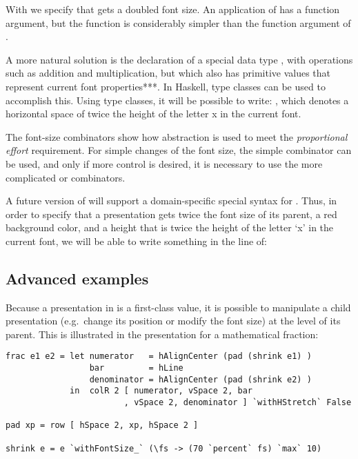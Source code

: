 With  we specify that  gets a doubled font size. An application of  has a function argument, but the function is considerably simpler than the function argument of . 

\bc A more natural solution is the declaration of a special data type , with operations such as addition and multiplication, but which also has primitive values that represent current font properties***. In Haskell, type classes can be used to accomplish this. Using type classes, it will be possible to write: , which denotes a horizontal space of twice the height of the letter x in the current font.\ec 


The font-size combinators show how abstraction is used to meet the {\em proportional effort} requirement. For simple changes of the font size, the simple  combinator can be used, and only if more control is desired, it is necessary to use the more complicated  or  combinators.

A future version of {\Xprez} will support a domain-specific special syntax for . Thus, in order to specify that  a presentation  gets twice the font size of its parent, a red background color, and a height that is twice the height of the letter `x' in the current font, we will be able to write something in the line of: 

\begin{small}
\end{small}

%																
\subsection{Advanced examples} \label{sect:xprezFrac}

Because a presentation in {\Xprez} is a first-class value, it is possible to manipulate a child presentation (e.g.\ change its position or modify the font size) at the level of its parent.  This is illustrated in the presentation for a mathematical fraction: 

\begin{small}
\begin{verbatim}
frac e1 e2 = let numerator   = hAlignCenter (pad (shrink e1) )
                 bar         = hLine
                 denominator = hAlignCenter (pad (shrink e2) )
             in  colR 2 [ numerator, vSpace 2, bar
                        , vSpace 2, denominator ] `withHStretch` False

pad xp = row [ hSpace 2, xp, hSpace 2 ]

shrink e = e `withFontSize_` (\fs -> (70 `percent` fs) `max` 10)
\end{verbatim}
\end{small}

